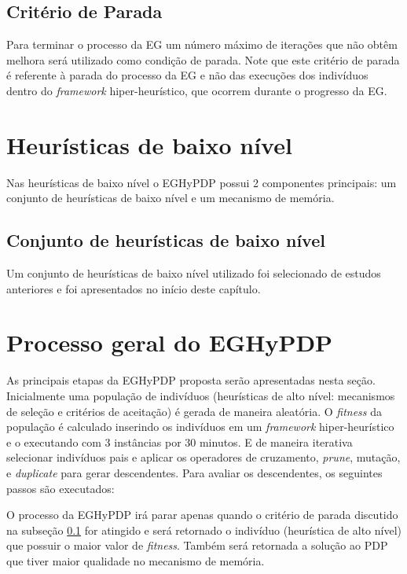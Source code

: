    


  
  \subsection{Critério de Parada}
  \label{sub:criterioParada}
  
  Para terminar o processo da EG um número máximo de iterações que não obtêm melhora será utilizado como condição de parada. Note que este critério de parada é referente à parada do processo da EG e não das execuções dos indivíduos dentro do \textit{framework} hiper-heurístico, que ocorrem durante o progresso da EG. 
  
  
  \section{Heurísticas de baixo nível}
  
  Nas heurísticas de baixo nível o EGHyPDP possui 2 componentes principais: um conjunto de heurísticas de baixo nível e um mecanismo de memória.
  
  \subsection{Conjunto de heurísticas de baixo nível}
  Um conjunto de heurísticas de baixo nível utilizado foi selecionado de estudos anteriores e foi apresentados no início deste capítulo.
  



\section{Processo geral do EGHyPDP} 

As principais etapas da EGHyPDP proposta serão apresentadas nesta seção.
Inicialmente uma população de indivíduos (heurísticas de alto nível: mecanismos de seleção e critérios de aceitação) é gerada de maneira aleatória. O \textit{fitness} da população é calculado inserindo os indivíduos em um \textit{framework} hiper-heurístico e o executando com 3 instâncias por 30 minutos. E de maneira iterativa selecionar indivíduos pais e aplicar os operadores de cruzamento, \textit{prune}, mutação, e \textit{duplicate} para gerar descendentes. Para avaliar os descendentes, os seguintes passos são executados:


O processo da EGHyPDP irá parar apenas quando o critério de parada discutido na subseção \ref{sub:criterioParada} for atingido e será retornado o indivíduo (heurística de alto nível) que possuir o maior valor de \textit{fitness}. Também será retornada a solução ao PDP que tiver maior qualidade no mecanismo de memória.



